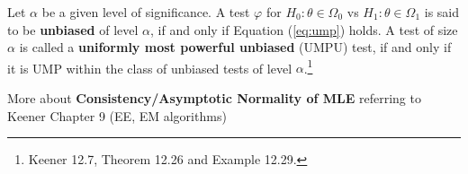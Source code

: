 \begin{definition}
    Let $\alpha$ be a given level of significance. 
    A test $\varphi$ for $H_0:\theta\in\Omega_0$ vs $H_1:\theta\in\Omega_1$ is said to be \textbf{unbiased} of level $\alpha$,
    if and only if Equation (\ref{eq:ump}) holds.
    A test of size $\alpha$ is called a \textbf{uniformly most powerful unbiased} (UMPU) test,
    if and only if it is UMP within the class of unbiased tests of level $\alpha$.\footnote{
    Keener 12.7, Theorem 12.26 and Example 12.29.
    }
\end{definition}

More about \textbf{Consistency/Asymptotic Normality of MLE} referring to Keener Chapter 9 (EE, EM algorithms)






